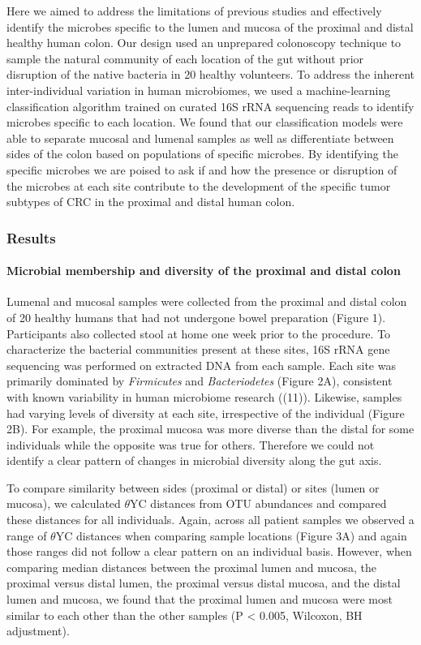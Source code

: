 \documentclass[11pt,]{article}
\let\oldparagraph\paragraph
\renewcommand{\paragraph}[1]{\oldparagraph{#1}\mbox{}}
\begin{document}
Here we aimed to address the limitations of previous studies and
effectively identify the microbes specific to the lumen and mucosa of
the proximal and distal healthy human colon. Our design used an
unprepared colonoscopy technique to sample the natural community of each
location of the gut without prior disruption of the native bacteria in
20 healthy volunteers. To address the inherent inter-individual
variation in human microbiomes, we used a machine-learning
classification algorithm trained on curated 16S rRNA sequencing reads to
identify microbes specific to each location. We found that our
classification models were able to separate mucosal and lumenal samples
as well as differentiate between sides of the colon based on populations
of specific microbes. By identifying the specific microbes we are poised
to ask if and how the presence or disruption of the microbes at each
site contribute to the development of the specific tumor subtypes of CRC
in the proximal and distal human colon.

\subsubsection{Results}\label{results}

\paragraph{Microbial membership and diversity of the proximal and distal
colon}\label{microbial-membership-and-diversity-of-the-proximal-and-distal-colon}

Lumenal and mucosal samples were collected from the proximal and distal
colon of 20 healthy humans that had not undergone bowel preparation
(Figure 1). Participants also collected stool at home one week prior to
the procedure. To characterize the bacterial communities present at
these sites, 16S rRNA gene sequencing was performed on extracted DNA
from each sample. Each site was primarily dominated by \emph{Firmicutes}
and \emph{Bacteriodetes} (Figure 2A), consistent with known variability
in human microbiome research ((11)). Likewise, samples had varying
levels of diversity at each site, irrespective of the individual (Figure
2B). For example, the proximal mucosa was more diverse than the distal
for some individuals while the opposite was true for others. Therefore
we could not identify a clear pattern of changes in microbial diversity
along the gut axis.

To compare similarity between sides (proximal or distal) or sites (lumen
or mucosa), we calculated \({\theta}\)YC distances from OTU abundances
and compared these distances for all individuals. Again, across all
patient samples we observed a range of \({\theta}\)YC distances when
comparing sample locations (Figure 3A) and again those ranges did not
follow a clear pattern on an individual basis. However, when comparing
median distances between the proximal lumen and mucosa, the proximal
versus distal lumen, the proximal versus distal mucosa, and the distal
lumen and mucosa, we found that the proximal lumen and mucosa were most
similar to each other than the other samples (P \textless{} 0.005,
Wilcoxon, BH adjustment).
\end{document}
